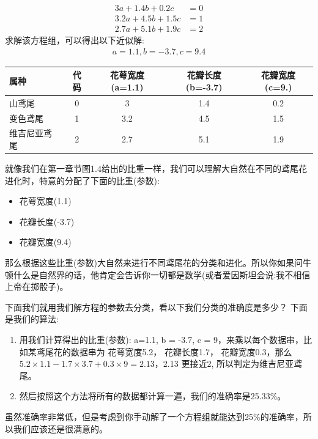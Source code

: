 \documentclass[12pt]{article}
\numberwithin{figure}{section}
\newenvironment{fullmodel}{
			\smallskip\noindent
			\begin{minipage}{\textwidth+\marginparwidth+\marginparsep}\smallskip\smallskip}
			{\smallskip\smallskip\end{minipage}\vspace{.1in}
			}
\numberwithin{equation}{section}
\begin{document}
\begin{align*}
		3a + 1.4b + 0.2c & = 0 \\
	3.2a + 4.5b + 1.5 c & = 1 \\
	2.7a + 5.1b + 1.9c & = 2 
\end{align*}
求解该方程组，可以得出以下近似解:
\begin{align*}
	a = 1.1, b = -3.7, c = 9.4 
\end{align*}

\begin{table}[H]
		\centering
		\begin{tabular}{lcccc}
		\hline 
			属种 & 代码 & 花萼宽度(a=1.1) &花瓣长度(b=-3.7) & 花瓣宽度(c=9.) \\
			\hline 
			山鸢尾 & 0 & 3 &  1.4 & 0.2 \\
			变色鸢尾 & 1 & 3.2 & 4.5  & 1.5 \\
			维吉尼亚鸢尾 & 2 & 2.7 &  5.1 & 1.9  \\
			\hline  
		\end{tabular}
\end{table}

\begin{fullmodel}
	\begin{tcolorbox}[title=自然界中的线性规律]
		就像我们在第一章节图1.4给出的比重一样，我们可以理解大自然在不同的鸢尾花进化时，特意的分配了下面的比重(参数):
		\begin{itemize}
			\item 花萼宽度(1.1)
			\item 花瓣长度(-3.7)
			\item 花瓣宽度(9.4)
		\end{itemize}
		那么根据这些比重(参数)大自然来进行不同鸢尾花的分类和进化。所以你如果问牛顿什么是自然界的话，他肯定会告诉你一切都是数学(或者爱因斯坦会说:我不相信上帝在掷骰子)。
	\end{tcolorbox}
\end{fullmodel}

\begin{example}
下面我们就用我们解方程的参数去分类，看以下我们分类的准确度是多少？	下面是我们的算法:
\begin{enumerate}
	\item 用我们计算得出的比重(参数): a=1.1, b = -3.7, c = 9，来乘以每个数据串，比如某鸢尾花的数据串为 花萼宽度5.2， 花瓣长度1.7， 花瓣宽度0.3，那么$5.2 \times 1.1 - 1.7 \times 3.7 + 0.3 \times 9 = 2.13$，2.13 更接近$2$, 所以判定为维吉尼亚鸢尾。
	\item 然后按照这个方法将所有的数据都计算一遍，我们的准确率是25.33\%。
\end{enumerate}
虽然准确率非常低，但是考虑到你手动解了一个方程组就能达到25\%的准确率，所以我们应该还是很满意的。
\end{example}
\end{document}
